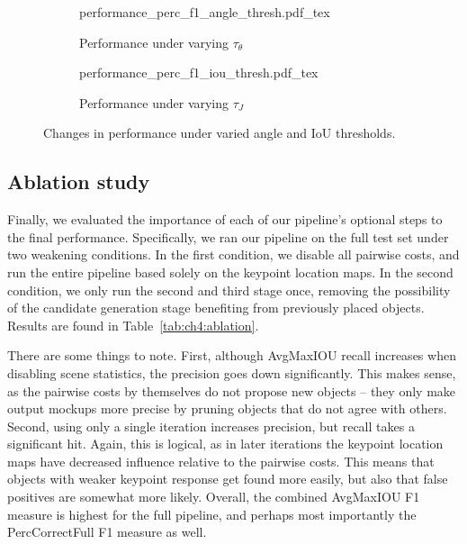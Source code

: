 \documentclass[10pt,twocolumn,letterpaper]{article}
\begin{document}
\begin{figure}[h!]
    \begin{subfigure}[t]{0.49\linewidth}
        \centering
        \def\svgwidth{\linewidth}
        {performance_perc_f1_angle_thresh.pdf_tex}
        \caption{Performance under varying $\tau_\theta$}
    \end{subfigure}
    \begin{subfigure}[t]{0.49\linewidth}
        \centering
        \def\svgwidth{\linewidth}
        {performance_perc_f1_iou_thresh.pdf_tex}
        \caption{Performance under varying $\tau_J$}
    \end{subfigure}
    \caption{Changes in performance under varied angle and IoU thresholds.}
    \label{fig:ch4:performance_changes}
\end{figure}


\subsection{Ablation study}
\label{sec:ch4:ablation}
Finally, we evaluated the importance of each of our pipeline's optional steps to the final performance. Specifically,
we ran our pipeline on the full test set under two weakening conditions. In the first condition, we disable all pairwise
costs, and run the entire pipeline based solely on the keypoint location maps. In the second condition, we only run
the second and third stage once, removing the possibility of the candidate generation stage benefiting from previously placed objects.
Results are found in Table~\ref{tab:ch4:ablation}.

There are some things to note. First, although AvgMaxIOU recall increases when disabling scene statistics, the precision goes down significantly. This makes sense,
as the pairwise costs by themselves do not propose new objects -- they only make output mockups more precise by pruning objects
that do not agree with others. Second, using only a single iteration increases precision, but recall takes a significant hit. Again, this is logical,
as in later iterations the keypoint location maps have decreased influence relative to the pairwise costs. This means that objects with weaker
keypoint response get found more easily, but also that false positives are somewhat more likely. Overall, the combined AvgMaxIOU F1 measure is highest
for the full pipeline, and perhaps most importantly the PercCorrectFull F1 measure as well.
\end{document}
